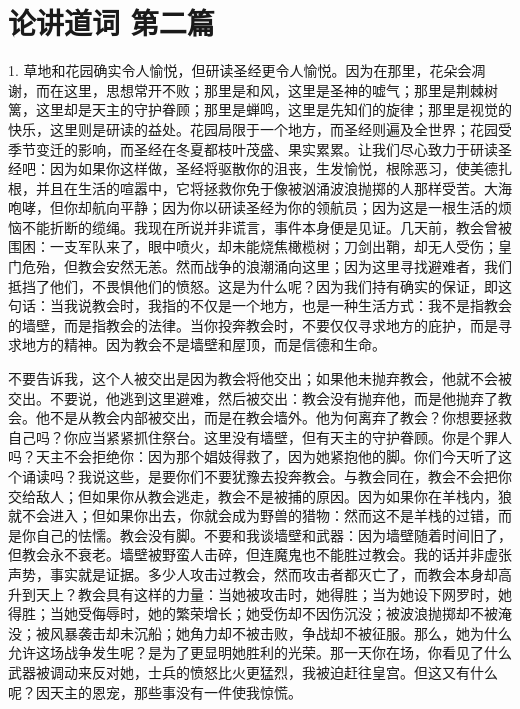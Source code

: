 
\chapter{论讲道词 第二篇}


\par

1. 草地和花园确实令人愉悦，但研读圣经更令人愉悦。因为在那里，花朵会凋谢，而在这里，思想常开不败；那里是和风，这里是圣神的嘘气；那里是荆棘树篱，这里却是天主的守护眷顾；那里是蝉鸣，这里是先知们的旋律；那里是视觉的快乐，这里则是研读的益处。花园局限于一个地方，而圣经则遍及全世界；花园受季节变迁的影响，而圣经在冬夏都枝叶茂盛、果实累累。让我们尽心致力于研读圣经吧：因为如果你这样做，圣经将驱散你的沮丧，生发愉悦，根除恶习，使美德扎根，并且在生活的喧嚣中，它将拯救你免于像被汹涌波浪抛掷的人那样受苦。大海咆哮，但你却航向平静；因为你以研读圣经为你的领航员；因为这是一根生活的烦恼不能折断的缆绳。我现在所说并非谎言，事件本身便是见证。几天前，教会曾被围困：一支军队来了，眼中喷火，却未能烧焦橄榄树；刀剑出鞘，却无人受伤；皇门危殆，但教会安然无恙。然而战争的浪潮涌向这里；因为这里寻找避难者，我们抵挡了他们，不畏惧他们的愤怒。这是为什么呢？因为我们持有确实的保证，即这句话：当我说教会时，我指的不仅是一个地方，也是一种生活方式：我不是指教会的墙壁，而是指教会的法律。当你投奔教会时，不要仅仅寻求地方的庇护，而是寻求地方的精神。因为教会不是墙壁和屋顶，而是信德和生命。\par

不要告诉我，这个人被交出是因为教会将他交出；如果他未抛弃教会，他就不会被交出。不要说，他逃到这里避难，然后被交出：教会没有抛弃他，而是他抛弃了教会。他不是从教会内部被交出，而是在教会墙外。他为何离弃了教会？你想要拯救自己吗？你应当紧紧抓住祭台。这里没有墙壁，但有天主的守护眷顾。你是个罪人吗？天主不会拒绝你：因为那个娼妓得救了，因为她紧抱他的脚。你们今天听了这个诵读吗？我说这些，是要你们不要犹豫去投奔教会。与教会同在，教会不会把你交给敌人；但如果你从教会逃走，教会不是被捕的原因。因为如果你在羊栈内，狼就不会进入；但如果你出去，你就会成为野兽的猎物：然而这不是羊栈的过错，而是你自己的怯懦。教会没有脚。不要和我谈墙壁和武器：因为墙壁随着时间旧了，但教会永不衰老。墙壁被野蛮人击碎，但连魔鬼也不能胜过教会。我的话并非虚张声势，事实就是证据。多少人攻击过教会，然而攻击者都灭亡了，而教会本身却高升到天上？教会具有这样的力量：当她被攻击时，她得胜；当为她设下网罗时，她得胜；当她受侮辱时，她的繁荣增长；她受伤却不因伤沉没；被波浪抛掷却不被淹没；被风暴袭击却未沉船；她角力却不被击败，争战却不被征服。那么，她为什么允许这场战争发生呢？是为了更显明她胜利的光荣。那一天你在场，你看见了什么武器被调动来反对她，士兵的愤怒比火更猛烈，我被迫赶往皇宫。但这又有什么呢？因天主的恩宠，那些事没有一件使我惊慌。\par

